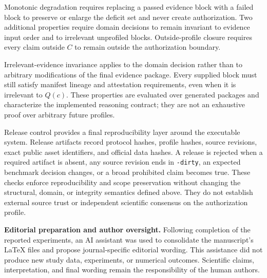 \documentclass[11pt,a4paper]{article}
\begin{document}
Monotonic degradation requires replacing a passed evidence block with a
failed block to preserve or enlarge the deficit set and never create
authorization. Two additional properties require domain decisions to remain
invariant to evidence input order and to irrelevant unprofiled blocks.
Outside-profile closure requires every claim outside $C$ to remain outside
the authorization boundary.

Irrelevant-evidence invariance applies to the domain decision rather than to
arbitrary modifications of the final evidence package. Every supplied block
must still satisfy manifest lineage and attestation requirements, even when it
is irrelevant to $Q(c)$. These properties are evaluated over generated
packages and characterize the implemented reasoning contract; they are not
an exhaustive proof over arbitrary future profiles.

Release control provides a final reproducibility layer around the executable
system. Release artifacts record protocol hashes, profile hashes, source
revisions, exact public asset identifiers, and official data hashes. A release
is rejected when a required artifact is absent, any source revision ends in
\texttt{-dirty}, an expected benchmark decision changes, or a broad
prohibited claim becomes true. These checks enforce reproducibility and scope
preservation without changing the structural, domain, or integrity semantics
defined above. They do not establish external source trust or independent
scientific consensus on the authorization profile.



\noindent\textbf{Editorial preparation and author oversight.}
Following completion of the reported experiments, an AI assistant was used to consolidate the manuscript's LaTeX files and propose journal-specific editorial wording. This assistance did not produce new study data, experiments, or numerical outcomes. Scientific claims, interpretation, and final wording remain the responsibility of the human authors.
\end{document}
